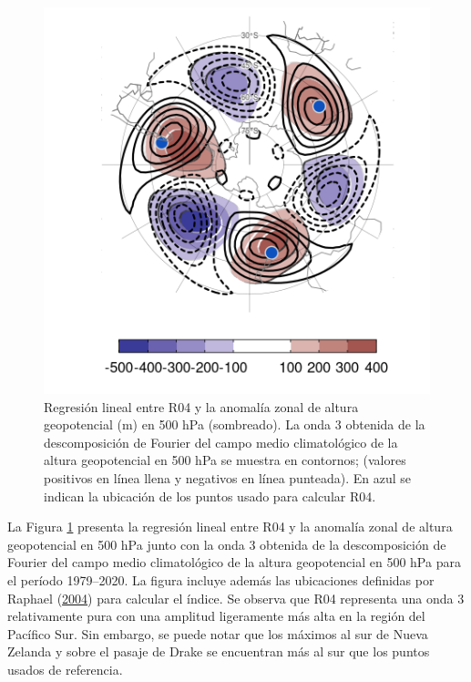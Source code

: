 \documentclass[12pt,oneside,a4paper]{reedthesis}
\begin{document}
\begin{figure}

{\centering \includegraphics{figures/15-onda3/raphael-regr-1} 

}

\caption{Regresión lineal entre R04 y la anomalía zonal de altura geopotencial (m) en 500 hPa (sombreado). La onda 3 obtenida de la descomposición de Fourier del campo medio climatológico de la altura geopotencial en 500 hPa se muestra en contornos; (valores positivos en línea llena y negativos en línea punteada). En azul se indican la ubicación de los puntos usado para calcular R04.}\label{fig:raphael-regr}
\end{figure}



La Figura \ref{fig:raphael-regr} presenta la regresión lineal entre R04 y la anomalía zonal de altura geopotencial en 500 hPa junto con la onda 3 obtenida de la descomposición de Fourier del campo medio climatológico de la altura geopotencial en 500 hPa para el período 1979--2020.
La figura incluye además las ubicaciones definidas por Raphael (\protect\hyperlink{ref-raphael2004}{2004}) para calcular el índice.
Se observa que R04 representa una onda 3 relativamente pura con una amplitud ligeramente más alta en la región del Pacífico Sur.
Sin embargo, se puede notar que los máximos al sur de Nueva Zelanda y sobre el pasaje de Drake se encuentran más al sur que los puntos usados de referencia.
\end{document}
